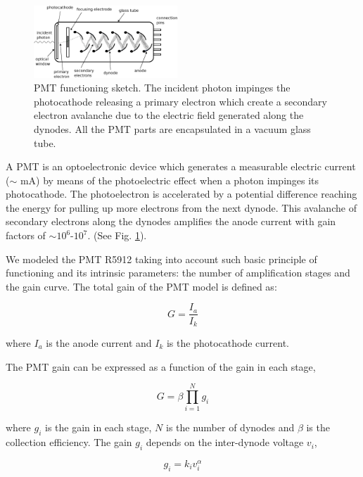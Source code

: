 \documentclass[letterpaper, 10 pt, conference]{ieeeconf}  %
\begin{document}
\begin{figure}[h!]
\begin{center}
\includegraphics[width=0.48\textwidth]{Figures/PMT.eps}
\caption{PMT functioning sketch. The incident photon impinges the photocathode releasing a primary electron which create a secondary electron avalanche due to the electric field generated along the dynodes. All the PMT parts are encapsulated in a vacuum glass tube.}
\label{PMT_sketch}
\end{center}
\end{figure}

A PMT is an optoelectronic device which generates a measurable electric current ($\sim$ mA) by means of the photoelectric effect when a photon impinges its photocathode. The photoelectron is accelerated by a potential difference reaching the energy for pulling up more electrons from the next dynode. This avalanche of secondary electrons along the dynodes amplifies the anode current with gain factors of $\sim10^6$-$10^7$. (See Fig. \ref{PMT_sketch}).

We modeled the PMT R5912 taking into account such basic principle of functioning and its intrinsic parameters: the number of amplification stages and the gain curve. The total gain of the PMT model is defined as:

\begin{equation}
G = \frac{I_a}{I_k}
\end{equation}

\noindent where $I_a$ is the anode current and $I_k$ is the photocathode current.

The PMT gain can be expressed as a function of the gain in each stage,

\begin{equation}
G =  \beta \prod_{i=1}^{N}  g_i 
\end{equation}

\noindent where $g_i$ is the gain in each stage, $N$ is the number of dynodes and $\beta$ is the collection efficiency. The gain $g_i$ depends on the inter-dynode voltage $v_i$,

\begin{equation}
g_i = k_i v_i^\alpha
\end{equation}
\end{document}

